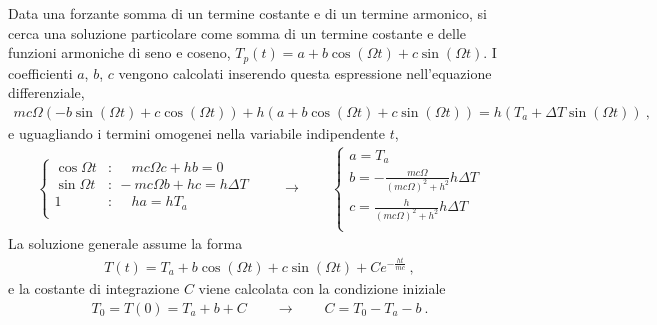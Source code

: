 \documentclass[letterpaper,10pt,italian]{jupyterBook}
\begin{document}
\sphinxAtStartPar
{} Data una forzante somma di un termine costante e di un termine armonico, si cerca una soluzione particolare come somma di un termine costante e delle funzioni armoniche di seno e coseno, \(T_p(t) = a + b \cos(\Omega t) + c \sin(\Omega t)\). I coefficienti \(a\), \(b\), \(c\) vengono calcolati inserendo questa espressione nell’equazione differenziale,
\begin{equation*}
\begin{split} m c \Omega \left( - b \sin(\Omega t) + c \cos(\Omega t) \right) + h \left( a + b \cos(\Omega t) + c \sin(\Omega t) \right) = h \left(  T_a + \Delta T \sin(\Omega t) \right) \ ,\end{split}
\end{equation*}
\sphinxAtStartPar
e uguagliando i termini omogenei nella variabile indipendente \(t\),
\begin{equation*}
\begin{split}\begin{cases}
\cos \Omega t & : \ \quad  m c \Omega c + h b = 0 \\
\sin \Omega t & : \ - m c \Omega b + h c = h \Delta T \\
            1 & : \ \quad h a = h T_a \\
\end{cases}
\qquad \rightarrow \qquad
\begin{cases}
 a = T_a \\
 b = -\frac{mc\Omega}{(m c \Omega)^2 + h^2} h \Delta T\\
 c =  \frac{h}{(m c \Omega)^2 + h^2} h \Delta T \\
\end{cases}
\end{split}
\end{equation*}
\sphinxAtStartPar
La soluzione generale assume la forma
\begin{equation*}
\begin{split}T(t) = T_a + b \cos(\Omega t) + c \sin(\Omega t) + C e^{-\frac{ht}{mc}} \ ,\end{split}
\end{equation*}
\sphinxAtStartPar
e la costante di integrazione \(C\) viene calcolata con la condizione iniziale
\begin{equation*}
\begin{split}T_0 = T(0) = T_a + b + C \qquad \rightarrow \qquad C = T_0 - T_a - b \ . \end{split}
\end{equation*}
\end{document}
